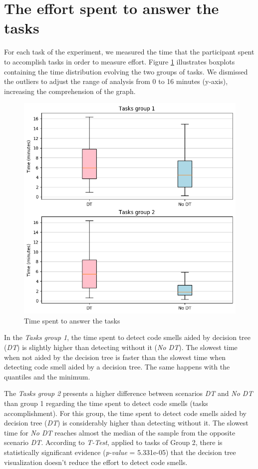 \section{The effort spent to answer the tasks} \label{sec:effortSpentAnswerTasks}

For each task of the experiment, we measured the time that the participant spent to accomplish tasks in order to measure effort. Figure \ref{fig:timeSpentAnswerTasks} illustrates boxplots containing the time distribution evolving the two groups of tasks. We dismissed the outliers to adjust the range of analysis from 0 to 16 minutes (y-axis), increasing the comprehension of the graph. 

\begin{figure}[ht]
\centering
\includegraphics[width=13cm]{figures/graph_boxplot_time_required.png}
\caption{Time spent to answer the tasks}
\label{fig:timeSpentAnswerTasks}
\end{figure}

In the \textit{Tasks group 1}, the time spent to detect code smells aided by decision tree (\textit{DT}) is slightly higher than detecting without it (\textit{No DT}). The slowest time when not aided by the decision tree is faster than the slowest time when detecting code smell aided by a decision tree. The same happens with the quantiles and the minimum.

The \textit{Tasks group 2} presents a higher difference between scenarios \textit{DT} and \textit{No DT} than group 1 regarding the time spent to detect code smells (tasks accomplishment). For this group, the time spent to detect code smells aided by decision tree (\textit{DT}) is considerably higher than detecting without it. The slowest time for \textit{No DT} reaches almost the median of the sample from the opposite scenario \textit{DT}. According to \textit{T-Test}, applied to tasks of Group 2, there is statistically significant evidence (\textit{p-value} = 5.331e-05) that the decision tree visualization doesn't reduce the effort to detect code smells. 

